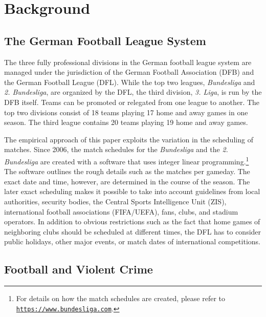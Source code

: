 \section{Background}\label{sec_soc_ext:background}



\subsection{The German Football League System}
The three fully professional divisions in the German football league system are managed under the jurisdiction of the German Football Association (DFB) and the German Football League (DFL). While the top two leagues, \textit{Bundesliga} and \textit{2. Bundesliga}, are organized by the DFL, the third division, \textit{3. Liga}, is run by the DFB itself. Teams can be promoted or relegated from one league to another. The top two divisions consist of 18 teams playing 17 home and away games in one season. The third league contains 20 teams playing 19 home and away games.

The empirical approach of this paper exploits the variation in the scheduling of matches. Since 2006, the match schedules for the \textit{Bundesliga} and the \textit{2. Bundesliga} are created with a software that uses integer linear programming.\footnote{For details on how the match schedules are created, please refer to \href{https://www.bundesliga.com/de/bundesliga/news/so-entsteht-der-spielplan-bundesliga-2-bundesliga-dfl-computer-software.jsp}{\texttt{https://www.bundesliga.com}}.} The software outlines the rough details such as the matches per gameday. The exact date and time, however, are determined in the course of the season. The later exact scheduling makes it possible to take into account guidelines from local authorities, security bodies, the Central Sports Intelligence Unit (ZIS), international football associations (FIFA/UEFA), fans, clubs, and stadium operators. In addition to obvious restrictions such as the fact that home games of neighboring clubs should be scheduled at different times, the DFL has to consider public holidays, other major events, or match dates of international competitions.



\subsection{Football and Violent Crime}

